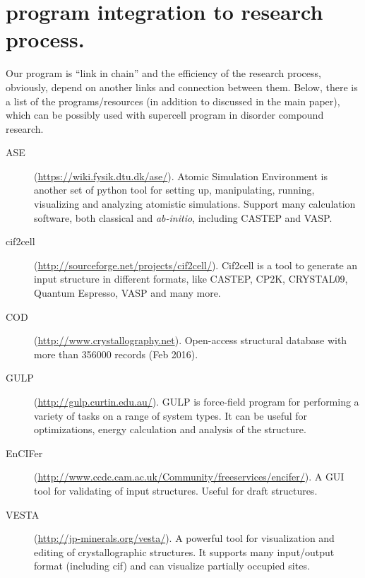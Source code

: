 \documentclass[a4paper,10pt]{article}
\begin{document}
\section*{\Sups{} program integration to research process.}
Our program is ``link in chain'' and the efficiency of the research process, obviously, depend on another links and connection between them. Below, there is a list of the programs/resources (in addition to discussed in the main paper), which can be possibly used with supercell program in disorder compound research.
\begin{description}
  \item[ASE] (\url{https://wiki.fysik.dtu.dk/ase/}). Atomic Simulation Environment is another set of python tool for setting up, manipulating, running, visualizing and analyzing atomistic simulations. Support many calculation software, both classical and \textit{ab-initio}, including CASTEP and VASP. 
  \item[cif2cell] (\url{http://sourceforge.net/projects/cif2cell/}). Cif2cell is a tool to generate an input structure in different formats, like CASTEP, CP2K, CRYSTAL09, Quantum Espresso, VASP and many more. 
  \item[COD] (\url{http://www.crystallography.net}). Open-access  structural database with more than \num{356000} records (Feb 2016). 
  \item[GULP] (\url{http://gulp.curtin.edu.au/}). GULP is force-field program for performing a variety of tasks on a range of system types. It can be useful for optimizations, energy calculation and analysis of the structure.
  \item[EnCIFer] (\url{http://www.ccdc.cam.ac.uk/Community/freeservices/encifer/}). A GUI tool for validating of \sups{} input structures. Useful for draft structures.
  \item[VESTA] (\url{http://jp-minerals.org/vesta/}). A powerful tool for visualization and editing of crystallographic structures. It supports many input/output format (including cif) and can visualize partially occupied sites.
\end{description}

 
\end{document}
